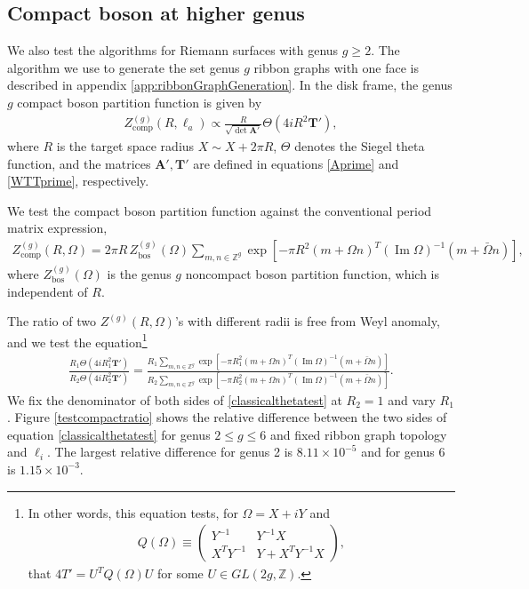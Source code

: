 \documentclass[12pt]{article}
\def\ie{\begin{equation}\begin{aligned}}
\def\fe{\end{aligned}\end{equation}}
\numberwithin{equation}{section}
\begin{document}
\subsection{Compact boson at higher genus}

We also test the algorithms for Riemann surfaces with genus $g\geq 2$. The algorithm we use to generate the set genus $g$ ribbon graphs with one face is described in appendix \ref{app:ribbonGraphGeneration}. In the disk frame, the genus $g$ compact boson partition function is given by
\ie
\label{eq:compactBosonPartFunc}
Z^{(g)}_\text{comp}(R,\ell_a)\propto \frac{R}{\sqrt{\det \mathbf{A}'}}\Theta(4 i R^2 \mathbf{T}'),
\fe
where $R$ is the target space radius $X\sim X+2\pi R$, $\Theta$ denotes the Siegel theta function, and the matrices $\mathbf{A}', \mathbf{T}'$ are defined in equations \eqref{Aprime} and \eqref{WTTprime}, respectively. 



We test the compact boson partition function against the conventional period matrix expression,
\ie
Z_{\mathrm{comp}}^{(g)}(R, \Omega)=2\pi R\,Z_{\mathrm{bos}}^{(g)}(\Omega) \sum_{m,n\in\mathbb Z^g}\exp\left[-\pi R^2(m+\Omega n)^T(\operatorname{Im}\Omega)^{-1}(m+\bar\Omega n)\right],
\fe
where $Z_{\mathrm{bos}}^{(g)}(\Omega)$ is the genus $g$ noncompact boson partition function, which is independent of $R$.

The ratio of two $Z^{(g)}(R, \Omega)$'s with different radii is free from Weyl anomaly, and we test the equation\footnote{In other words, this equation tests, for $\Omega=X+iY$ and
\ie
Q(\Omega)\equiv\begin{pmatrix}
Y^{-1}&Y^{-1}X\\
X^TY^{-1}&Y+X^TY^{-1}X
\end{pmatrix},
\fe 
that $4T'=U^TQ(\Omega)U$ for some $U\in GL(2g,\mathbb{Z})$.
}
\ie \label{classicalthetatest}
\frac{R_1\Theta(4iR_1^2\mathbf T')}{R_2\Theta(4iR_2^2\mathbf T')}=\frac{R_1\displaystyle\sum_{m,n\in\mathbb Z^g}\exp\left[-\pi R_1^2(m+\Omega n)^T(\operatorname{Im}\Omega)^{-1}(m+\bar\Omega n)\right]}{R_2\displaystyle\sum_{m,n\in\mathbb Z^g}\exp\left[-\pi R_2^2(m+\Omega n)^T(\operatorname{Im}\Omega)^{-1}(m+\bar\Omega n)\right]}.
\fe
We fix the denominator of both sides of \eqref{classicalthetatest} at $R_2=1$ and vary $R_1$. Figure \ref{testcompactratio} shows the relative difference between the two sides of equation \ref{classicalthetatest} for genus $2\leq g\leq 6$ and fixed ribbon graph topology and $\ell_i$. The largest relative difference for genus 2 is $8.11\times 10^{-5}$ and for genus 6 is $1.15\times 10^{-3}$.
\end{document}
